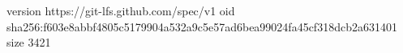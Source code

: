version https://git-lfs.github.com/spec/v1
oid sha256:f603e8abbf4805c5179904a532a9c5e57ad6bea99024fa45cf318dcb2a631401
size 3421
